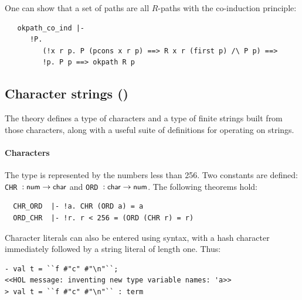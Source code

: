 {One can show that a set  of paths are all $R$-paths with the
co-induction principle:
\begin{hol}
\begin{verbatim}
   okpath_co_ind |-
      !P.
         (!x r p. P (pcons x r p) ==> R x r (first p) /\ P p) ==>
         !p. P p ==> okpath R p
\end{verbatim}
\end{hol}


\subsection{Character strings ()}

The theory  defines a type of characters and a type
of finite strings built from those characters, along with a useful suite of
definitions for operating on strings.

\paragraph {Characters}

The type  is represented by the numbers less than 256. Two
constants are defined: {\small\verb+CHR +}$: \mbox{\small{\textbf{\sf{num}}}}\to\mbox{\small{\textbf{\sf{char}}}}$ and
{\small\verb+ORD +}$: \mbox{\small{\textbf{\sf{char}}}}\to\mbox{\small{\textbf{\sf{num}}}}$. The following theorems
hold:
\begin{hol}
\begin{verbatim}
  CHR_ORD  |- !a. CHR (ORD a) = a
  ORD_CHR  |- !r. r < 256 = (ORD (CHR r) = r)
\end{verbatim}
\end{hol}

Character literals can also be entered using \ML{} syntax, with a hash
character immediately followed by a string literal of length one.
Thus:
\setcounter{sessioncount}{0}
\begin{session}
\begin{verbatim}
- val t = ``f #"c" #"\n"``;
<<HOL message: inventing new type variable names: 'a>>
> val t = ``f #"c" #"\n"`` : term


\end{verbatim}
\end{session}}
